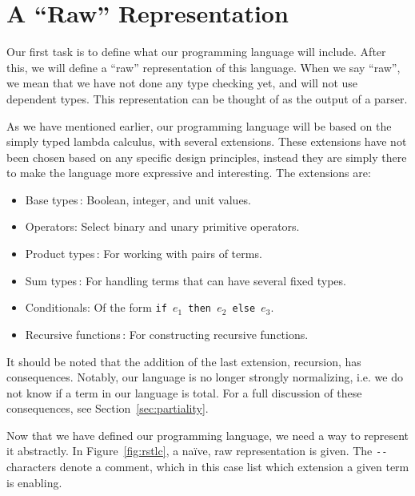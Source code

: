 \section{A ``Raw'' Representation}
\label{sec:the-simply-typed-lambda-calculus}

Our first task is to define what our programming language will include. After this, we will define a ``raw'' representation of this language. When we say ``raw'', we mean that we have not done any type checking yet, and will not use dependent types. This representation can be thought of as the output of a parser. 

As we have mentioned earlier, our programming language will be based on the simply typed lambda calculus, with several extensions. These extensions have not been chosen based on any specific design principles, instead they are simply there to make the language more expressive and interesting. The extensions are:
\begin{itemize}
\item Base types\,\cite[pp. 117]{Pierce:TypeSystems}: Boolean, integer, and unit values.
\item Operators: Select binary and unary primitive operators.
\item Product types\,\cite[pp. 126]{Pierce:TypeSystems}: For working with pairs of terms.
\item Sum types\,\cite[pp. 132]{Pierce:TypeSystems}: For handling terms that can have several fixed types.
\item Conditionals: Of the form \texttt{if $e_{1}$ then $e_{2}$ else $e_{3}$}.
\item Recursive functions\,\cite[pp. 142]{Pierce:TypeSystems}: For constructing recursive functions.
\end{itemize}

It should be noted that the addition of the last extension, recursion, has consequences. Notably, our language is no longer strongly normalizing, i.e. we do not know if a term in our language is total. For a full discussion of these consequences, see Section~\ref{sec:partiality}.

Now that we have defined our programming language, we need a way to represent it abstractly. In Figure~\ref{fig:rstlc}, a naïve, raw representation is given. The \verb+--+ characters denote a comment, which in this case list which extension a given term is enabling.

